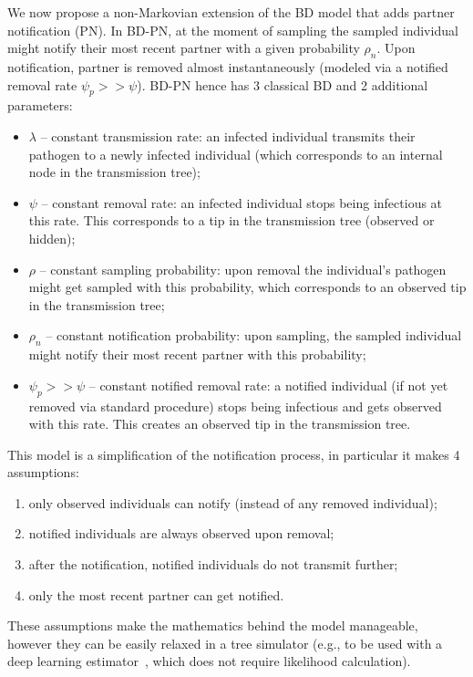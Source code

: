 \documentclass[a4paper,10pt]{article}
\begin{document}
We now propose a non-Markovian extension of the BD model that adds partner notification (PN).  In BD-PN, at the moment of sampling the sampled individual might notify their most recent partner with a given probability $\rho_n$. Upon notification, partner is removed almost instantaneously (modeled via a notified removal rate $\psi_p >> \psi$). BD-PN hence has 3 classical BD and 2 additional parameters:
\begin{itemize}
 \item $\lambda$ -- constant transmission rate: an infected individual transmits their pathogen to a newly infected individual (which corresponds to an internal node in the transmission tree);
 \item $\psi$ -- constant removal rate: an infected individual stops being infectious at this rate. This corresponds to a tip in the transmission tree (observed or hidden);
 \item $\rho$ -- constant sampling probability: upon removal the individual's pathogen might get sampled with this probability, which corresponds to an observed tip in the transmission tree;
 \item $\rho_n$ -- constant notification probability: upon sampling, the sampled individual might notify their most recent partner with this probability;
 \item $\psi_p >> \psi$ -- constant notified removal rate: a notified individual (if not yet removed via standard procedure) stops being infectious and gets observed with this rate. This creates an observed tip in the transmission tree.
\end{itemize}


This model is a simplification of the notification process, in particular it makes 4 assumptions:
\begin{enumerate}
\item only observed individuals can notify (instead of any removed individual);
\item notified individuals are always observed upon removal;
\item after the notification, notified individuals do not transmit further;
\item only the most recent partner can get notified.
\end{enumerate}

These assumptions make the mathematics behind the model manageable, however they can be easily relaxed in a tree simulator (e.g., to be used with a deep learning estimator~\cite{Voznica2021}, which does not require likelihood calculation).
\end{document}
